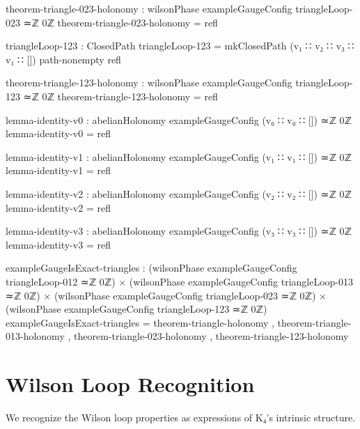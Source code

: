\documentclass[11pt,a4paper]{book}
\begin{document}
\begin{code}
theorem-triangle-023-holonomy : wilsonPhase exampleGaugeConfig triangleLoop-023 ≃ℤ 0ℤ
theorem-triangle-023-holonomy = refl

triangleLoop-123 : ClosedPath
triangleLoop-123 = mkClosedPath 
  (v₁ ∷ v₂ ∷ v₃ ∷ v₁ ∷ [])
  path-nonempty
  refl

theorem-triangle-123-holonomy : wilsonPhase exampleGaugeConfig triangleLoop-123 ≃ℤ 0ℤ
theorem-triangle-123-holonomy = refl

lemma-identity-v0 : abelianHolonomy exampleGaugeConfig (v₀ ∷ v₀ ∷ []) ≃ℤ 0ℤ
lemma-identity-v0 = refl

lemma-identity-v1 : abelianHolonomy exampleGaugeConfig (v₁ ∷ v₁ ∷ []) ≃ℤ 0ℤ
lemma-identity-v1 = refl

lemma-identity-v2 : abelianHolonomy exampleGaugeConfig (v₂ ∷ v₂ ∷ []) ≃ℤ 0ℤ
lemma-identity-v2 = refl

lemma-identity-v3 : abelianHolonomy exampleGaugeConfig (v₃ ∷ v₃ ∷ []) ≃ℤ 0ℤ
lemma-identity-v3 = refl

exampleGaugeIsExact-triangles : 
  (wilsonPhase exampleGaugeConfig triangleLoop-012 ≃ℤ 0ℤ) ×
  (wilsonPhase exampleGaugeConfig triangleLoop-013 ≃ℤ 0ℤ) ×
  (wilsonPhase exampleGaugeConfig triangleLoop-023 ≃ℤ 0ℤ) ×
  (wilsonPhase exampleGaugeConfig triangleLoop-123 ≃ℤ 0ℤ)
exampleGaugeIsExact-triangles = 
  theorem-triangle-holonomy , 
  theorem-triangle-013-holonomy , 
  theorem-triangle-023-holonomy , 
  theorem-triangle-123-holonomy
\end{code}

\section{Wilson Loop Recognition}

We recognize the Wilson loop properties as expressions of K₄'s intrinsic structure.
\end{document}
